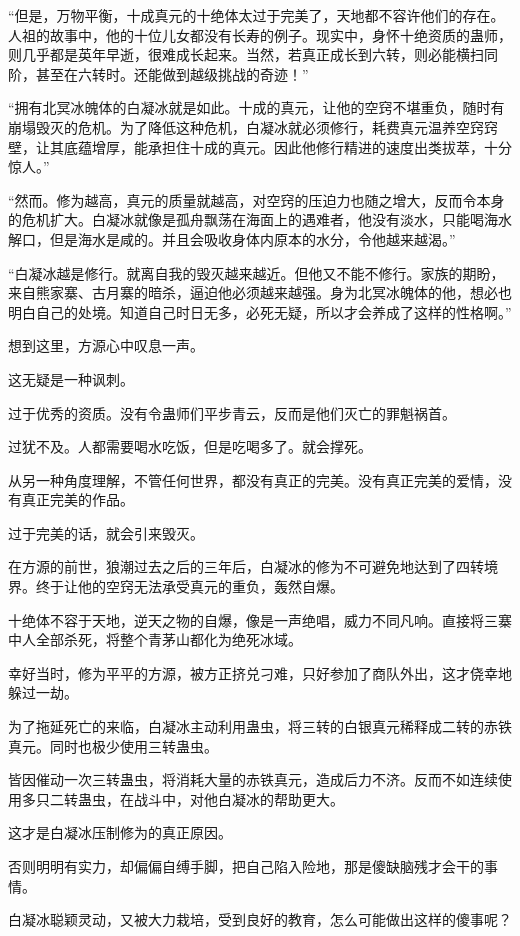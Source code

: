\begin{this_body}
“但是，万物平衡，十成真元的十绝体太过于完美了，天地都不容许他们的存在。人祖的故事中，他的十位儿女都没有长寿的例子。现实中，身怀十绝资质的蛊师，则几乎都是英年早逝，很难成长起来。当然，若真正成长到六转，则必能横扫同阶，甚至在六转时。还能做到越级挑战的奇迹！”

“拥有北冥冰魄体的白凝冰就是如此。十成的真元，让他的空窍不堪重负，随时有崩塌毁灭的危机。为了降低这种危机，白凝冰就必须修行，耗费真元温养空窍窍壁，让其底蕴增厚，能承担住十成的真元。因此他修行精进的速度出类拔萃，十分惊人。”

“然而。修为越高，真元的质量就越高，对空窍的压迫力也随之增大，反而令本身的危机扩大。白凝冰就像是孤舟飘荡在海面上的遇难者，他没有淡水，只能喝海水解口，但是海水是咸的。并且会吸收身体内原本的水分，令他越来越渴。”

“白凝冰越是修行。就离自我的毁灭越来越近。但他又不能不修行。家族的期盼，来自熊家寨、古月寨的暗杀，逼迫他必须越来越强。身为北冥冰魄体的他，想必也明白自己的处境。知道自己时日无多，必死无疑，所以才会养成了这样的性格啊。”

想到这里，方源心中叹息一声。

这无疑是一种讽刺。

过于优秀的资质。没有令蛊师们平步青云，反而是他们灭亡的罪魁祸首。

过犹不及。人都需要喝水吃饭，但是吃喝多了。就会撑死。

从另一种角度理解，不管任何世界，都没有真正的完美。没有真正完美的爱情，没有真正完美的作品。

过于完美的话，就会引来毁灭。

在方源的前世，狼潮过去之后的三年后，白凝冰的修为不可避免地达到了四转境界。终于让他的空窍无法承受真元的重负，轰然自爆。

十绝体不容于天地，逆天之物的自爆，像是一声绝唱，威力不同凡响。直接将三寨中人全部杀死，将整个青茅山都化为绝死冰域。

幸好当时，修为平平的方源，被方正挤兑刁难，只好参加了商队外出，这才侥幸地躲过一劫。

为了拖延死亡的来临，白凝冰主动利用蛊虫，将三转的白银真元稀释成二转的赤铁真元。同时也极少使用三转蛊虫。

皆因催动一次三转蛊虫，将消耗大量的赤铁真元，造成后力不济。反而不如连续使用多只二转蛊虫，在战斗中，对他白凝冰的帮助更大。

这才是白凝冰压制修为的真正原因。

否则明明有实力，却偏偏自缚手脚，把自己陷入险地，那是傻缺脑残才会干的事情。

白凝冰聪颖灵动，又被大力栽培，受到良好的教育，怎么可能做出这样的傻事呢？


\end{this_body}
